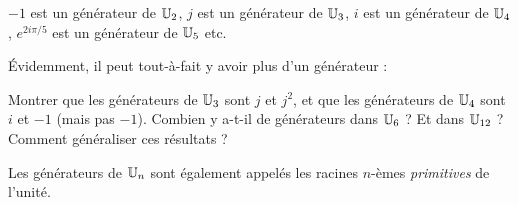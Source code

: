 \begin{exemples}
$-1$ est un générateur de $\mathbb{U}_2$, $j$ est un générateur de $\mathbb{U}_3$, $i$ est un générateur de $\mathbb{U}_4$, $e^{2i\pi/5}$ est un générateur de $\mathbb{U}_5$ etc.
\end{exemples}

Évidemment, il peut tout-à-fait y avoir plus d'un générateur : 

\begin{exercice}
Montrer que les générateurs de $\mathbb{U}_3$ sont $j$ et $j^2$, et que les générateurs de $\mathbb{U}_4$ sont $i$ et $-1$ (mais pas $-1$). Combien y a-t-il de générateurs dans $\mathbb{U}_6$ ? Et dans $\mathbb{U}_{12}$ ? Comment généraliser ces résultats ?
\end{exercice}

\begin{definition}
Les générateurs de $\mathbb{U}_n$ sont également appelés les racines $n$-èmes \emph{primitives} de l'unité.
\end{definition}

